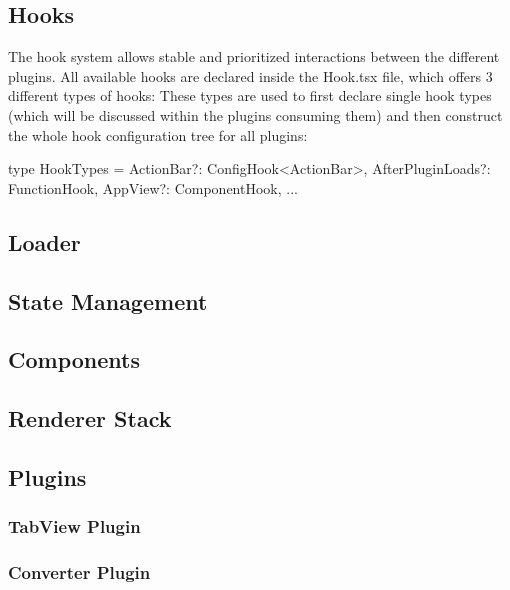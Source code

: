\subsection{Hooks}\label{sec_hooks}
The hook system allows stable and prioritized interactions between the different
plugins. All available hooks are declared inside the {Hook.tsx} file, which
offers 3 different types of hooks:
These types are used to first declare single hook types (which will be discussed
within the plugins consuming them) and then construct the whole hook
configuration tree for all plugins:
\begin{typescript}
type HookTypes = {
  ActionBar?: ConfigHook<ActionBar>,
  AfterPluginLoads?: FunctionHook,
  AppView?: ComponentHook,
...
}
\end{typescript}




\subsection{Loader}


\subsection{State Management}

\subsection{Components}

\subsection{Renderer Stack}

\subsection{Plugins}

\subsubsection{TabView Plugin}


\subsubsection{Converter Plugin}
